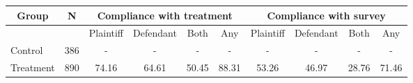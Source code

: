 \begin{tabular}{lccccccccc}
\toprule
\multicolumn{1}{c}{Group} & N & \multicolumn{4}{c}{Compliance with treatment} & \multicolumn{4}{c}{Compliance with survey} \\
\midrule
\midrule 
 &  & Plaintiff & Defendant & Both & Any & Plaintiff & Defendant & Both & Any \\ 
\midrule 
Control & 386 & - & - & - & - & - & - & - & - \\ 
Treatment & 890 & 74.16 & 64.61 & 50.45 & 88.31 & 53.26 & 46.97 & 28.76 & 71.46 \\ 
\bottomrule
\end{tabular}%
